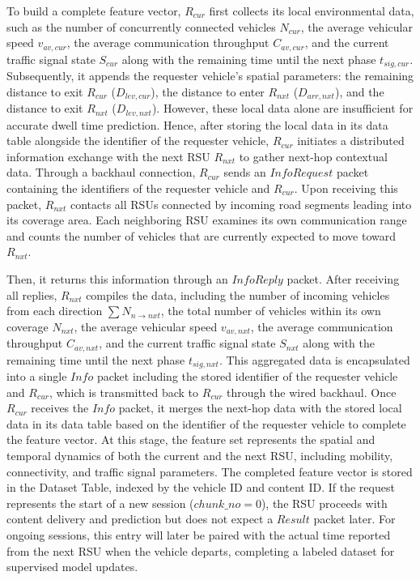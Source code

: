 \documentclass[journal]{IEEEtran}
\begin{document}
To build a complete feature vector, $R_{cur}$ first collects its local environmental data, such as the number of concurrently connected vehicles $N_{cur}$, the average vehicular speed $v_{av, cur}$, the average communication throughput $C_{av, cur}$, and the current traffic signal state $S_{cur}$ along with the remaining time until the next phase $t_{sig, cur}$.
Subsequently, it appends the requester vehicle's spatial parameters: the remaining distance to exit $R_{cur}$ ($D_{lev, cur}$), the distance to enter $R_{nxt}$ ($D_{arr, nxt}$), and the distance to exit $R_{nxt}$ ($D_{lev, nxt}$).
However, these local data alone are insufficient for accurate dwell time prediction.
Hence, after storing the local data in its data table alongside the identifier of the requester vehicle, $R_{cur}$ initiates a distributed information exchange with the next RSU $R_{nxt}$ to gather next-hop contextual data.
Through a backhaul connection, $R_{cur}$ sends an \(Info Request\) packet containing the identifiers of the requester vehicle and $R_{cur}$.
Upon receiving this packet, $R_{nxt}$ contacts all RSUs connected by incoming road segments leading into its coverage area.
Each neighboring RSU examines its own communication range and counts the number of vehicles that are currently expected to move toward $R_{nxt}$.

Then, it returns this information through an \(Info Reply\) packet.
After receiving all replies, $R_{nxt}$ compiles the data, including the number of incoming vehicles from each direction $\sum N_{n\rightarrow nxt}$, the total number of vehicles within its own coverage $N_{nxt}$, the average vehicular speed $v_{av, nxt}$, the average communication throughput $C_{av, nxt}$, and the current traffic signal state $S_{nxt}$ along with the remaining time until the next phase $t_{sig, nxt}$.
This aggregated data is encapsulated into a single \(Info\) packet including the stored identifier of the requester vehicle and $R_{cur}$, which is transmitted back to $R_{cur}$ through the wired backhaul.
Once $R_{cur}$ receives the $Info$ packet, it merges the next-hop data with the stored local data in its data table based on the identifier of the requester vehicle to complete the feature vector.
At this stage, the feature set represents the spatial and temporal dynamics of both the current and the next RSU, including mobility, connectivity, and traffic signal parameters.
The completed feature vector is stored in the Dataset Table, indexed by the vehicle ID and content ID.
If the request represents the start of a new session (\(chunk\_no = 0\)), the RSU proceeds with content delivery and prediction but does not expect a \(Result\) packet later.
For ongoing sessions, this entry will later be paired with the actual time reported from the next RSU when the vehicle departs, completing a labeled dataset for supervised model updates.
\end{document}
